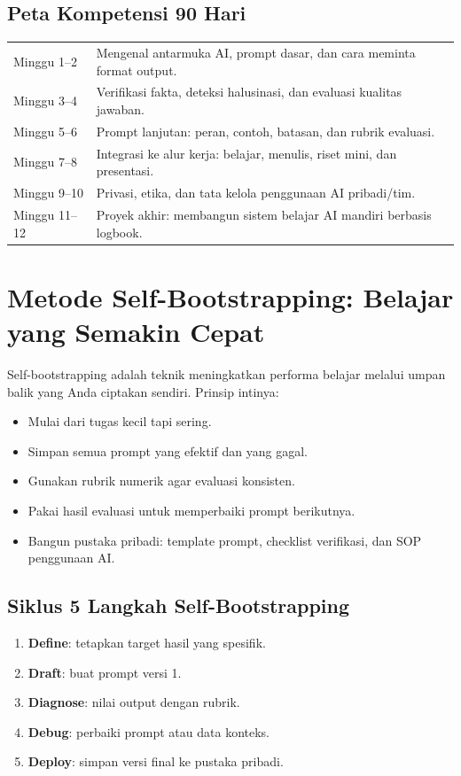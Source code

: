 \documentclass[12pt,oneside]{book}
\begin{document}
\section*{Peta Kompetensi 90 Hari}
\begin{longtable}{p{}p{}}
Minggu 1--2 & Mengenal antarmuka AI, prompt dasar, dan cara meminta format output.\\
Minggu 3--4 & Verifikasi fakta, deteksi halusinasi, dan evaluasi kualitas jawaban.\\
Minggu 5--6 & Prompt lanjutan: peran, contoh, batasan, dan rubrik evaluasi.\\
Minggu 7--8 & Integrasi ke alur kerja: belajar, menulis, riset mini, dan presentasi.\\
Minggu 9--10 & Privasi, etika, dan tata kelola penggunaan AI pribadi/tim.\\
Minggu 11--12 & Proyek akhir: membangun sistem belajar AI mandiri berbasis logbook.\\
\end{longtable}
\clearpage

\chapter{Metode Self-Bootstrapping: Belajar yang Semakin Cepat}
Self-bootstrapping adalah teknik meningkatkan performa belajar melalui umpan balik yang Anda ciptakan sendiri. Prinsip intinya:
\begin{itemize}[leftmargin=*]
\item Mulai dari tugas kecil tapi sering.
\item Simpan semua prompt yang efektif dan yang gagal.
\item Gunakan rubrik numerik agar evaluasi konsisten.
\item Pakai hasil evaluasi untuk memperbaiki prompt berikutnya.
\item Bangun pustaka pribadi: template prompt, checklist verifikasi, dan SOP penggunaan AI.
\end{itemize}

\section*{Siklus 5 Langkah Self-Bootstrapping}
\begin{enumerate}[leftmargin=*]
\item \textbf{Define}: tetapkan target hasil yang spesifik.
\item \textbf{Draft}: buat prompt versi 1.
\item \textbf{Diagnose}: nilai output dengan rubrik.
\item \textbf{Debug}: perbaiki prompt atau data konteks.
\item \textbf{Deploy}: simpan versi final ke pustaka pribadi.
\end{enumerate}
\end{document}
